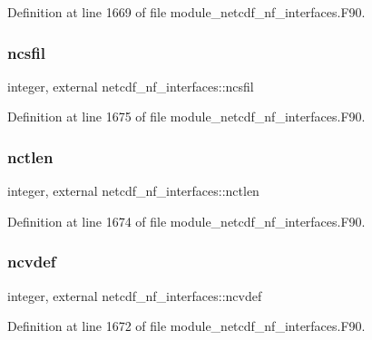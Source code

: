 Definition at line 1669 of file module\+\_\+netcdf\+\_\+nf\+\_\+interfaces.\+F90.

\mbox{\label{namespacenetcdf__nf__interfaces_a80f7509a41906746b45260d8ac63ec2b}} 
\subsubsection{\texorpdfstring{ncsfil}{ncsfil}}
{\footnotesize\ttfamily integer, external netcdf\+\_\+nf\+\_\+interfaces\+::ncsfil}



Definition at line 1675 of file module\+\_\+netcdf\+\_\+nf\+\_\+interfaces.\+F90.

\mbox{\label{namespacenetcdf__nf__interfaces_a4e214b358ce1001955e4a9b538eec4ed}} 
\subsubsection{\texorpdfstring{nctlen}{nctlen}}
{\footnotesize\ttfamily integer, external netcdf\+\_\+nf\+\_\+interfaces\+::nctlen}



Definition at line 1674 of file module\+\_\+netcdf\+\_\+nf\+\_\+interfaces.\+F90.

\mbox{\label{namespacenetcdf__nf__interfaces_afe0da902f495271e711f147b4128e17e}} 
\subsubsection{\texorpdfstring{ncvdef}{ncvdef}}
{\footnotesize\ttfamily integer, external netcdf\+\_\+nf\+\_\+interfaces\+::ncvdef}



Definition at line 1672 of file module\+\_\+netcdf\+\_\+nf\+\_\+interfaces.\+F90.

